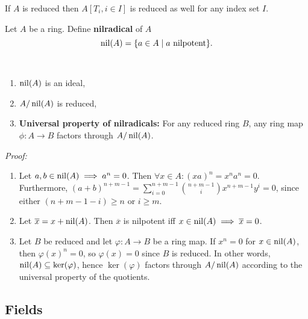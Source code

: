 \begin{lemma}
    If $A$ is reduced then $A[T_i, i\in I]$ is reduced as well for any index set $I$.
\end{lemma}

\begin{definition}
    Let $A$ be a ring. Define \textbf{nilradical} of $A$
    $$\operatorname{nil}(A)=\{a\in A \mid a \text{ nilpotent}\}.$$
\end{definition}

\begin{proposition}~

    \begin{enumerate}
        \item $\operatorname{nil}(A)$ is an ideal,
        \item $A/\operatorname{nil}(A)$ is reduced,
        \item \textbf{Universal property of nilradicals:} For any reduced ring $B$, any ring map $\phi: A\rightarrow B$ factors through $A/\operatorname{nil}(A)$.
    \end{enumerate}     
\end{proposition}


\textit{Proof:} 
\begin{enumerate}
    \item Let $a, b\in \operatorname{nil}(A) \implies a^n = 0$. Then $\forall x \in A: (xa)^n = x^n a^n=0$. Furthermore, $(a+b)^{n+m-1} = \sum_{i=0}^{n+m-1} \binom{n+m-1}{i}x^{n+m-1}y^i = 0$, since either $(n+m-1-i)\geq n$ or $i\geq m$.
    \item Let $\overline{x} = x + \operatorname{nil}(A)$. Then $\overline{x}$ is nilpotent iff $x\in \operatorname{nil}(A) \implies \overline{x} = 0$.
    \item Let $B$ be reduced and let $\varphi: A \rightarrow B$ be a ring map. If $x^n=0$ for $x\in\operatorname{nil}(A)$, then $\varphi(x)^n=0$, so $\varphi(x)=0$ since $B$ is reduced. In other words, $\operatorname{nil}(A)\subseteq \ker(\varphi)$, hence $\ker(\varphi)$ factors through $A / \operatorname{nil}(A)$ according to the universal property of the quotients.
\end{enumerate}

\subsection{Fields}

